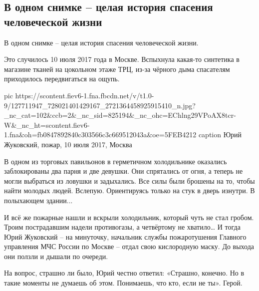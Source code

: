  
 
 
 
 

\subsection{В одном снимке – целая история спасения человеческой жизни}

В одном снимке – целая история спасения человеческой жизни.

Это случилось 10 июля 2017 года в Москве. Вспыхнула какая-то синтетика в
магазине тканей на цокольном этаже ТРЦ, из-за чёрного дыма спасателям
приходилось передвигаться на ощупь.

\ifcmt
pic https://scontent.fiev6-1.fna.fbcdn.net/v/t1.0-9/127711947_728021401429167_2721364458925915410_n.jpg?_nc_cat=102&ccb=2&_nc_sid=825194&_nc_ohc=EChlng29VPoAX8tcr-W&_nc_ht=scontent.fiev6-1.fna&oh=fb0847892840c303566c3c669512043a&oe=5FEB4212
caption Юрий Жуковский, пожар, 10 июля 2017, Москва
\fi

В одном из торговых павильонов в герметичном холодильнике оказались
заблокированы два парня и две девушки. Они спрятались от огня, а теперь не
могли выбраться из ловушки и задыхались. Все силы были брошены на то, чтобы
найти молодых людей. Вслепую. Ориентируясь только на стук в дверь изнутри. В
полыхающем здании...

И всё же пожарные нашли и вскрыли холодильник, который чуть не стал гробом.
Троим пострадавшим надели противогазы, а четвёртому не хватило… И тогда Юрий
Жуковский – на минуточку, начальник службы пожаротушения Главного управления
МЧС России по Москве – отдал свою кислородную маску. До выхода они ползли и
дышали по очереди.

На вопрос, страшно ли было, Юрий честно ответил: «Страшно, конечно. Но в такие
моменты не думаешь об этом. Понимаешь, что кто, если не ты». Герой.

